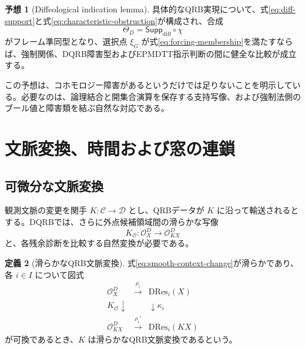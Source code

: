 \documentclass[a4paper,11pt]{ltjsarticle}
\theoremstyle{definition}
\newtheorem{definition}{定義}[section]
\newtheorem{conjecture}[definition]{予想}
\theoremstyle{plain}
\newcommand{\DRes}{\mathrm{DRes}}
\begin{document}
\begin{conjecture}[Diffeological indication lemma]
具体的なQRB実現について、式\eqref{eq:diff-support}と式\eqref{eq:characteristic-obstruction}が構成され、合成
\begin{equation}
 \Theta_D=
 \mathsf{Supp}_{\mathrm{diff}}\circ\chi
 \end{equation}
がフレーム準同型となり、選択点 $\xi_G$ が式\eqref{eq:forcing-membership}を満たすならば、強制関係、DQRB障害型およびEPMDTT指示判断の間に健全な比較が成立する。
\end{conjecture}

この予想は、コホモロジー障害があるというだけでは足りないことを明示している。必要なのは、論理結合と開集合演算を保存する支持写像、および強制法側のブール値と障害類を結ぶ自然な対応である。

\section{文脈変換、時間および窓の連鎖}

\subsection{可微分な文脈変換}

観測文脈の変更を関手 $K:\mathcal C\to\mathcal D$ とし、QRBデータが $K$ に沿って輸送されるとする。DQRBでは、さらに外点候補領域間の滑らかな写像
\begin{equation}
 K_{\mathcal O}:\mathcal O_X^{D}\longrightarrow
 \mathcal O_{KX}^{D}
 \label{eq:smooth-context-change}
\end{equation}
と、各残余診断を比較する自然変換が必要である。

\begin{definition}[滑らかなQRB文脈変換]
式\eqref{eq:smooth-context-change}が滑らかであり、各 $i\in I$ について図式
\begin{equation}
 \begin{array}{ccc}
 \mathcal O_X^D & \xrightarrow{\rho_i} & \DRes_i(X)\\
 {\scriptstyle K_{\mathcal O}}\downarrow &&
 \downarrow{\scriptstyle\kappa_i}\\
 \mathcal O_{KX}^D & \xrightarrow{\rho_i'} & \DRes_i(KX)
 \end{array}
 \label{eq:diagnostic-naturality}
\end{equation}
が可換であるとき、$K$ は滑らかなQRB文脈変換であるという。
\end{definition}
\end{document}
